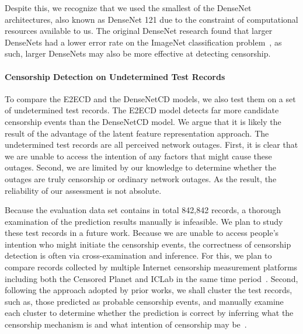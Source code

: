 Despite this, we recognize that we used the smallest of the DenseNet
architectures, also known as DenseNet 121 due to the constraint of
computational resources available to us.  The original DenseNet research found
that larger DenseNets had a lower error rate on the ImageNet classification
problem~\cite{huang_densely_2017}, as such, larger DenseNets may also be more
effective at detecting censorship. %


\paragraph{Censorship Detection on Undetermined Test Records}
To compare the E2ECD and the DenseNetCD models, we also test them on a set of
undetermined test records. The E2ECD model detects far more candidate
censorship events than the DenseNetCD model. We argue that it is likely the
result of the advantage of the latent feature representation approach.  The
undetermined test records are all perceived network outages.  First, it is
clear that we are unable to access the intention of any factors that might
cause these outages. Second, we are limited by our knowledge to determine
whether the outages are truly censorship or ordinary network outages. As the
result, the reliability of our assessment is not absolute.

Because the evaluation data set contains in total 842,842 records, a thorough
examination of the prediction results manually is infeasible. We plan to study
these test records in a future work. Because we are unable to access people's intention
who might initiate the censorship events, the correctness of censorship 
detection is often via cross-examination and inference. For this, we plan to
compare records collected by multiple Internet censorship measurement 
platforms including both the Censored Planet and 
ICLab in the same time period~\cite{sundara_raman_censored_2020,niaki2020iclab}. 
Second, following the approach adopted by prior works, we shall cluster
the test records, such as, those predicted as probable censorship events, 
and manually examine each cluster to determine whether the prediction is correct
by inferring what the censorship mechanism is and what intention 
of censorship may be~\cite{jones2014automated,sundara_raman_censored_2020,niaki2020iclab}. 

